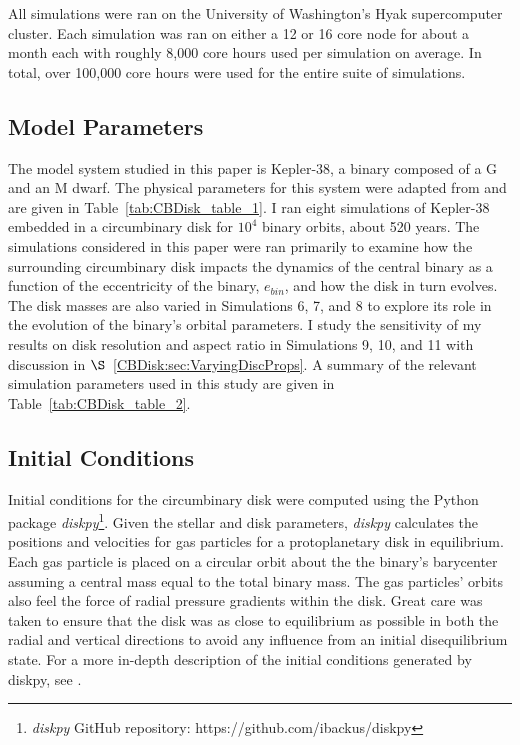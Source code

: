 All simulations were ran on the University of Washington's Hyak supercomputer cluster.  Each simulation was ran on either a 12 or 16 core node for about a month each with roughly 8,000 core hours used per simulation on average.  In total, over 100,000 core hours were used for the entire suite of simulations.

\subsection{Model Parameters}

The model system studied in this paper is Kepler-38, a binary composed of a G and an M dwarf.  The physical parameters for this 
system were adapted from \citet{Orosz2012} and are given in Table~\ref{tab:CBDisk_table_1}.  I ran eight simulations of Kepler-38 embedded in a 
circumbinary disk for $10^4$ binary orbits, about 520 years.  The simulations considered in this paper were ran primarily to examine how 
the surrounding circumbinary disk impacts the dynamics of the central
binary as a function of the eccentricity of the binary, $e_{bin}$, and
how the disk in turn evolves.  The disk masses are also varied in Simulations 6, 7, and 8 to explore its role in the evolution of the binary's orbital parameters.  
I study the sensitivity of my results on disk resolution and aspect ratio in Simulations 9, 10, and 11 with discussion in $\S$~\ref{CBDisk:sec:VaryingDiscProps}.  A summary of the relevant simulation parameters used in this study are given in Table~\ref{tab:CBDisk_table_2}. 

\subsection{Initial Conditions}

Initial conditions for the circumbinary disk were computed using the
Python package {\em diskpy}\footnote{{\em diskpy} GitHub repository: https://github.com/ibackus/diskpy}.  
Given the stellar and disk parameters, {\em diskpy}
calculates the positions and velocities for gas particles for a
protoplanetary disk in equilibrium.   Each gas particle is placed on a
circular orbit about the the binary's barycenter assuming a central
mass equal to the total binary mass.  
The gas particles' orbits also feel the force of radial pressure gradients within the disk.  Great care was taken to ensure that the disk
was as close to equilibrium as possible in both the radial and vertical directions to avoid any influence from an initial disequilibrium
state.  For a more in-depth description of the initial conditions generated by diskpy, see \citet{Backus2016}.

